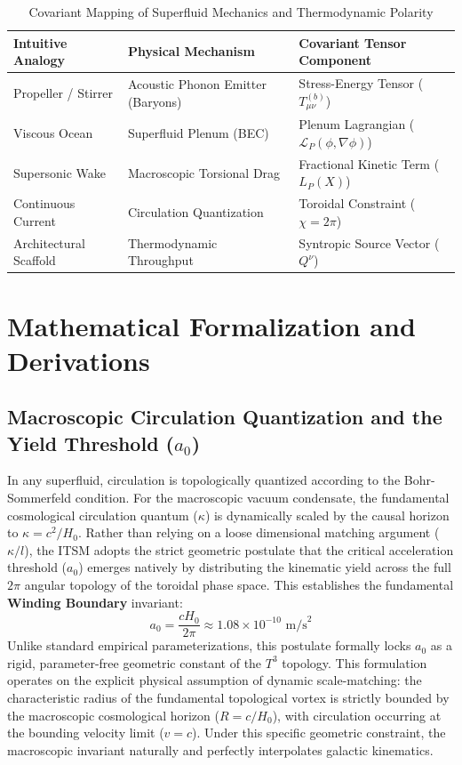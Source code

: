 \documentclass[aps,prd,10pt,twocolumn,superscriptaddress,nofootinbib,floatfix]{revtex4-2}
\begin{document}
\begin{table}[htbp]
\centering
\caption{\footnotesize Covariant Mapping of Superfluid Mechanics and Thermodynamic Polarity}
\label{tab:covariant}
\begin{tabular}{lll}
\toprule
\textbf{Intuitive Analogy} & \textbf{Physical Mechanism} & \textbf{Covariant Tensor Component} \\
\midrule
Propeller / Stirrer & Acoustic Phonon Emitter (Baryons) & Stress-Energy Tensor ($T_{\mu\nu}^{(b)}$) \\
Viscous Ocean & Superfluid Plenum (BEC) & Plenum Lagrangian ($\mathcal{L}_P(\phi,\nabla\phi)$) \\
Supersonic Wake & Macroscopic Torsional Drag & Fractional Kinetic Term ($L_P(X)$) \\
Continuous Current & Circulation Quantization & Toroidal Constraint ($\chi=2\pi$) \\
Architectural Scaffold & Thermodynamic Throughput & Syntropic Source Vector ($Q^\nu$) \\
\bottomrule
\end{tabular}
\end{table}

\section{\label{sec:math}Mathematical Formalization and Derivations}

\subsection{Macroscopic Circulation Quantization and the Yield Threshold (\texorpdfstring{$a_0$}{a0})}
In any superfluid, circulation is topologically quantized according to the Bohr-Sommerfeld condition. For the macroscopic vacuum condensate, the fundamental cosmological circulation quantum ($\kappa$) is dynamically scaled by the causal horizon to $\kappa = c^2/H_0$. Rather than relying on a loose dimensional matching argument ($\kappa/l$), the ITSM adopts the strict geometric postulate that the critical acceleration threshold ($a_0$) emerges natively by distributing the kinematic yield across the full $2\pi$ angular topology of the toroidal phase space. This establishes the fundamental \textbf{Winding Boundary} invariant:
\begin{equation}
a_0 = \frac{c H_0}{2\pi} \approx 1.08 \times 10^{-10} \text{ m/s}^2
\end{equation}
Unlike standard empirical parameterizations, this postulate formally locks $a_0$ as a rigid, parameter-free geometric constant of the $T^3$ topology. This formulation operates on the explicit physical assumption of dynamic scale-matching: the characteristic radius of the fundamental topological vortex is strictly bounded by the macroscopic cosmological horizon ($R = c/H_0$), with circulation occurring at the bounding velocity limit ($v = c$). Under this specific geometric constraint, the macroscopic invariant naturally and perfectly interpolates galactic kinematics.
\end{document}
